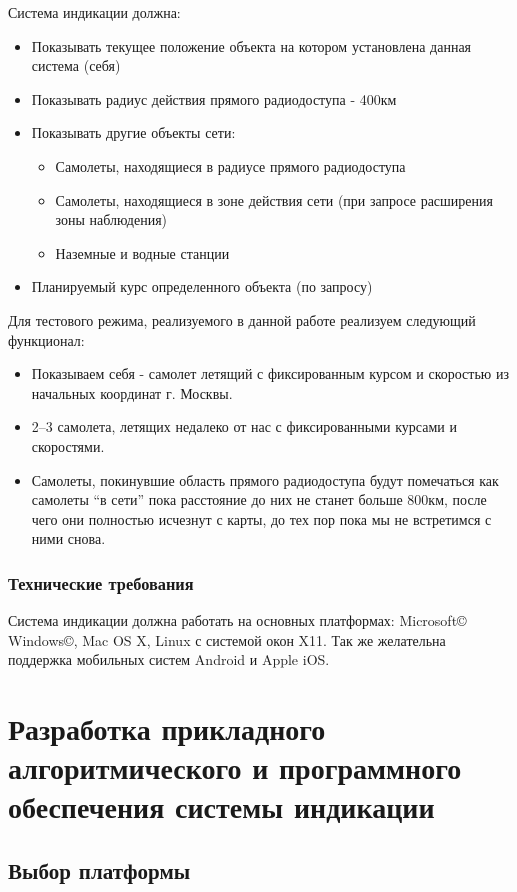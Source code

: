 \documentclass[a4paper,12pt]{report} %
\begin{document}
Система индикации должна:
\begin{itemize}
\item Показывать текущее положение объекта на котором установлена данная система
  (себя)
\item Показывать радиус действия прямого радиодоступа - 400км
\item Показывать другие объекты сети:
  \begin{itemize}
  \item Самолеты, находящиеся в радиусе прямого радиодоступа
  \item Самолеты, находящиеся в зоне действия сети (при запросе расширения зоны
    наблюдения)
  \item Наземные и водные станции
  \end{itemize}
\item Планируемый курс определенного объекта (по запросу)
\end{itemize}

Для тестового режима, реализуемого в данной работе реализуем следующий
функционал:
\begin{itemize}
\item Показываем себя - самолет летящий с фиксированным курсом и скоростью из
  начальных координат г. Москвы.
\item 2--3 самолета, летящих недалеко от нас с фиксированными курсами и
  скоростями.
\item Самолеты, покинувшие область прямого радиодоступа будут помечаться как
  самолеты ``в сети'' пока расстояние до них не станет больше 800км, после чего
  они полностью исчезнут с карты, до тех пор пока мы не встретимся с ними снова.
\end{itemize}

\subsection{Технические требования}

Система индикации должна работать на основных платформах: Microsoft\copyright
Windows\copyright, Mac OS X, Linux с системой окон X11. Так же желательна
поддержка мобильных систем Android и Apple iOS.
\newpage

\chapter{Разработка прикладного алгоритмического и  программного
  обеспечения  системы индикации} %

\section{Выбор платформы}
\end{document}

